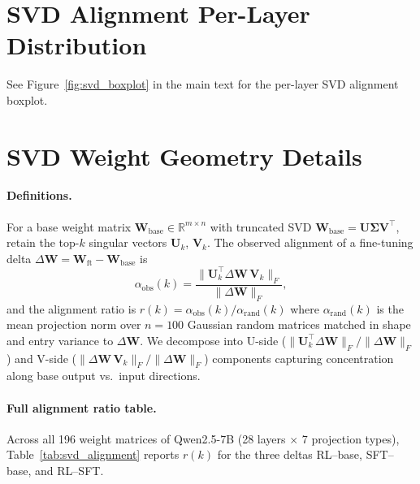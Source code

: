 \section{SVD Alignment Per-Layer Distribution}
\label{app:svd_boxplot}

See Figure~\ref{fig:svd_boxplot} in the main text for the per-layer SVD alignment boxplot.

\section{SVD Weight Geometry Details}
\label{app:svd_details}

\paragraph{Definitions.}
For a base weight matrix $\mathbf{W}_\text{base}\!\in\!\mathbb{R}^{m\times n}$ with truncated SVD $\mathbf{W}_\text{base}\!=\!\mathbf{U}\boldsymbol{\Sigma}\mathbf{V}^\top$, retain the top-$k$ singular vectors $\mathbf{U}_k$, $\mathbf{V}_k$. The observed alignment of a fine-tuning delta $\Delta\mathbf{W}\!=\!\mathbf{W}_\text{ft}-\mathbf{W}_\text{base}$ is
\[
\alpha_\text{obs}(k)=\frac{\|\mathbf{U}_k^\top\Delta\mathbf{W}\,\mathbf{V}_k\|_F}{\|\Delta\mathbf{W}\|_F},
\]
and the alignment ratio is $r(k)=\alpha_\text{obs}(k)/\alpha_\text{rand}(k)$ where $\alpha_\text{rand}(k)$ is the mean projection norm over $n\!=\!100$ Gaussian random matrices matched in shape and entry variance to $\Delta\mathbf{W}$. We decompose into U-side ($\|\mathbf{U}_k^\top\Delta\mathbf{W}\|_F/\|\Delta\mathbf{W}\|_F$) and V-side ($\|\Delta\mathbf{W}\,\mathbf{V}_k\|_F/\|\Delta\mathbf{W}\|_F$) components capturing concentration along base output vs.\ input directions.

\paragraph{Full alignment ratio table.}
Across all 196 weight matrices of Qwen2.5-7B (28 layers $\times$ 7 projection types), Table~\ref{tab:svd_alignment} reports $r(k)$ for the three deltas RL--base, SFT--base, and RL--SFT.

